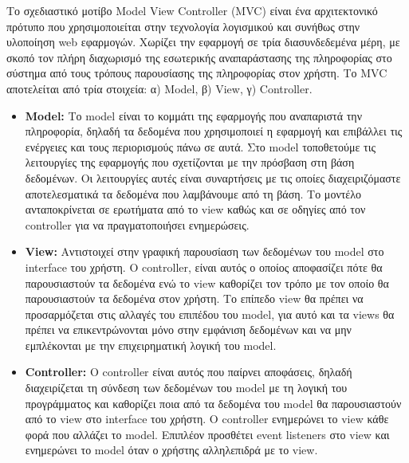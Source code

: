 		Το σχεδιαστικό μοτίβο Model View Controller (MVC) είναι ένα αρχιτεκτονικό πρότυπο που χρησιμοποιείται στην τεχνολογία λογισμικού και συνήθως στην υλοποίηση web εφαρμογών. Χωρίζει την εφαρμογή σε τρία διασυνδεδεμένα μέρη, με σκοπό τον πλήρη διαχωρισμό της εσωτερικής αναπαράστασης  της πληροφορίας στο σύστημα από τους τρόπους παρουσίασης της πληροφορίας στον χρήστη. Το MVC αποτελείται από τρία στοιχεία: α) Model, β) View, γ) Controller.
		\begin{itemize} 
		\item\textbf{Model:} Το model είναι το κομμάτι της εφαρμογής που αναπαριστά την πληροφορία, δηλαδή τα δεδομένα που χρησιμοποιεί η εφαρμογή και επιβάλλει τις ενέργειες και τους περιορισμούς πάνω σε αυτά.  Στο model τοποθετούμε τις λειτουργίες της εφαρμογής που σχετίζονται με την πρόσβαση στη βάση δεδομένων. Οι λειτουργίες αυτές είναι συναρτήσεις με τις οποίες διαχειριζόμαστε αποτελεσματικά τα δεδομένα που λαμβάνουμε από τη βάση.  Το μοντέλο ανταποκρίνεται σε ερωτήματα από το view καθώς και σε οδηγίες από τον controller για να πραγματοποιήσει ενημερώσεις.
		\item\textbf{View:} Αντιστοιχεί στην γραφική παρουσίαση των δεδομένων του model στο interface του χρήστη. Ο controller, είναι αυτός ο οποίος αποφασίζει πότε θα παρουσιαστούν τα δεδομένα ενώ το view καθορίζει τον τρόπο με τον οποίο θα παρουσιαστούν τα δεδομένα στον χρήστη. Το επίπεδο view θα πρέπει να προσαρμόζεται στις αλλαγές του επιπέδου του model, για αυτό και τα views θα πρέπει να επικεντρώνονται μόνο στην εμφάνιση δεδομένων και να μην εμπλέκονται με την επιχειρηματική λογική του model.
		\item\textbf{Controller:} Ο controller είναι αυτός που παίρνει αποφάσεις, δηλαδή διαχειρίζεται τη σύνδεση των δεδομένων του model με τη λογική του προγράμματος και καθορίζει ποια από τα δεδομένα του model θα παρουσιαστούν από το view στο interface του χρήστη. Ο controller ενημερώνει το view κάθε φορά που αλλάζει το model. Επιπλέον προσθέτει event listeners στο view και ενημερώνει το model όταν ο χρήστης αλληλεπιδρά με το view.
	 \end{itemize}		
